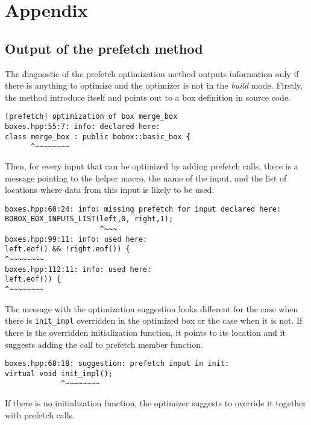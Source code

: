 \documentclass[12pt,a4paper]{report}
\def\code#1{\texttt{#1}}
\def\chapwithtoc#1{
\chapter*{#1}
\addcontentsline{toc}{chapter}{#1}
}
\begin{document}
\chapwithtoc{Appendix}
\section{Output of the prefetch method}
\label{output-prefetch}
The diagnostic of the prefetch optimization method outputs information only if there is anything to optimize and the optimizer is not in the \emph{build} mode. Firstly, the method introduce itself and points out to a box definition in source code.

\begin{lstlisting}[emph={prefetch,merge\_box,boxes,hpp},emphstyle={\textbf}]
[prefetch] optimization of box merge_box
boxes.hpp:55:7: info: declared here:
class merge_box : public bobox::basic_box {
      ^~~~~~~~~
\end{lstlisting}

Then, for every input that can be optimized by adding prefetch calls, there is a message pointing to the helper macro, the name of the input, and the list of locations where data from this input is likely to be used.

\begin{lstlisting}[emph={left,boxes,hpp},emphstyle={\textbf}]
boxes.hpp:60:24: info: missing prefetch for input declared here:
BOBOX_BOX_INPUTS_LIST(left,0, right,1);
                      ^~~~
boxes.hpp:99:11: info: used here:
left.eof() && !right.eof()) {
^~~~~~~~~
boxes.hpp:112:11: info: used here:
left.eof()) {
^~~~~~~~~
\end{lstlisting}

The message with the optimization suggestion looks different for the case when there is \code{init\_impl} overridden in the optimized box or the case when it is not. If there is the overridden initialization function, it points to its location and it suggests adding the call to prefetch member function.

\begin{lstlisting}[emph={init\_impl,boxes,hpp},emphstyle={\textbf}]
boxes.hpp:68:18: suggestion: prefetch input in init:
virtual void init_impl();
             ^~~~~~~~~
\end{lstlisting}

If there is no initialization function, the optimizer suggests to override it together with prefetch calls.
\end{document}
